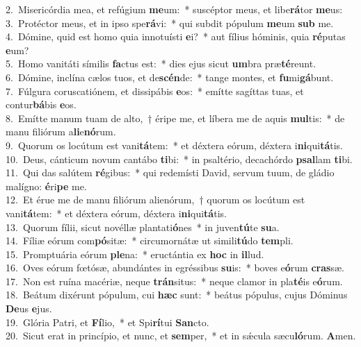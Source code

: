 {2.~}Misericórdia mea, et refúgium \textbf{me}um:~* suscéptor meus, et libe\textbf{rá}tor \textbf{me}us:\\
{3.~}Protéctor meus, et in ipso spe\textbf{rá}vi:~* qui subdit pópulum \textbf{me}um \textbf{sub} me.\\
{4.~}Dómine, quid est homo quia innotuísti \textbf{e}i?~* aut fílius hóminis, quia \textbf{ré}putas \textbf{e}um?\\
{5.~}Homo vanitáti símilis \textbf{fa}ctus est:~* dies ejus sicut \textbf{um}bra præ\textbf{té}reunt.\\
{6.~}Dómine, inclína cælos tuos, et de\textbf{scén}de:~* tange montes, et \textbf{fu}mi\textbf{gá}bunt.\\
{7.~}Fúlgura coruscatiónem, et dissipábis \textbf{e}os:~* emítte sagíttas tuas, et contur\textbf{bá}bis \textbf{e}os.\\
{8.~}Emítte manum tuam de alto,~† éripe me, et líbera me de aquis \textbf{mul}tis:~* de manu filiórum a\textbf{li}e\textbf{nó}rum.\\
{9.~}Quorum os locútum est vani\textbf{tá}tem:~* et déxtera eórum, déxtera i\textbf{ni}qui\textbf{tá}tis.\\
{10.~}Deus, cánticum novum cantábo \textbf{ti}bi:~* in psaltério, decachórdo \textbf{psal}lam \textbf{ti}bi.\\
{11.~}Qui das salútem \textbf{ré}gibus:~* qui redemísti David, servum tuum, de gládio malígno: \textbf{é}ri\textbf{pe} me.\\
{12.~}Et érue me de manu filiórum alienórum,~† quorum os locútum est vani\textbf{tá}tem:~* et déxtera eórum, déxtera i\textbf{ni}qui\textbf{tá}tis.\\
{13.~}Quorum fílii, sicut novéllæ plantati\textbf{ó}nes~* in juven\textbf{tú}te \textbf{su}a.\\
{14.~}Fíliæ eórum com\textbf{pó}sitæ:~* circumornátæ ut simili\textbf{tú}do \textbf{tem}pli.\\
{15.~}Promptuária eórum \textbf{ple}na:~* eructántia ex \textbf{hoc} in \textbf{il}lud.\\
{16.~}Oves eórum fœtósæ, abundántes in egréssibus \textbf{su}is:~* boves e\textbf{ó}rum \textbf{cras}sæ.\\
{17.~}Non est ruína macériæ, neque \textbf{trán}situs:~* neque clamor in pla\textbf{té}is e\textbf{ó}rum.\\
{18.~}Beátum dixérunt pópulum, cui \textbf{hæc} sunt:~* beátus pópulus, cujus Dóminus \textbf{De}us \textbf{e}jus.\\
{19.~}Glória Patri, et \textbf{Fí}lio,~* et Spi\textbf{rí}tui \textbf{San}cto.\\
{20.~}Sicut erat in princípio, et nunc, et \textbf{sem}per,~* et in sǽcula sæcu\textbf{ló}rum. \textbf{A}men.\\
